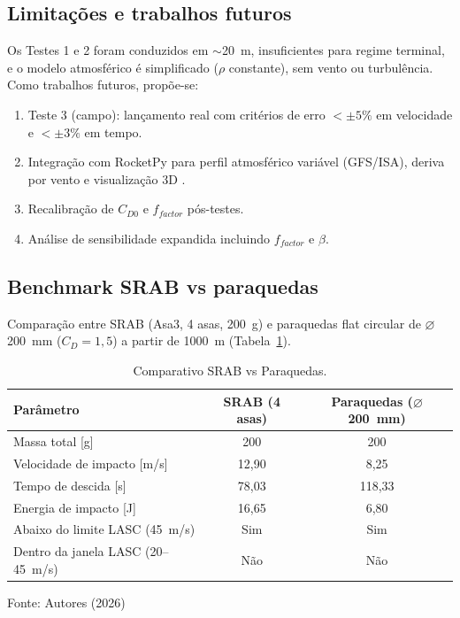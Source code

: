 \documentclass[12pt,fleqn]{article}
\begin{document}
\subsection{Limitações e trabalhos futuros}

Os Testes 1 e 2 foram conduzidos em $\sim$20~m, insuficientes para regime terminal, e o modelo atmosférico é simplificado ($\rho$ constante), sem vento ou turbulência. Como trabalhos futuros, propõe-se:

\begin{enumerate}
  \item Teste 3 (campo): lançamento real com critérios de erro $< \pm 5\%$ em velocidade e $< \pm 3\%$ em tempo.
  \item Integração com RocketPy para perfil atmosférico variável (GFS/ISA), deriva por vento e visualização 3D \citep{rocketpy2024}.
  \item Recalibração de $C_{D0}$ e $f_{factor}$ pós-testes.
  \item Análise de sensibilidade expandida incluindo $f_{factor}$ e $\beta$.
\end{enumerate}

\subsection{Benchmark SRAB vs paraquedas}

Comparação entre SRAB (Asa3, 4 asas, 200~g) e paraquedas flat circular de $\varnothing$200~mm ($C_D = 1,5$) a partir de 1000~m (Tabela~\ref{tab:benchmark}).

\begin{table}[htbp]
\caption{Comparativo SRAB vs Paraquedas.}
\centering
\begin{tabular*}{\textwidth}{@{\extracolsep{\fill}}lcc}
\hline
Parâmetro & SRAB (4 asas) & Paraquedas ($\varnothing$200~mm) \\
\hline
Massa total [g] & 200 & 200 \\
Velocidade de impacto [m/s] & 12,90 & 8,25 \\
Tempo de descida [s] & 78,03 & 118,33 \\
Energia de impacto [J] & 16,65 & 6,80 \\
Abaixo do limite LASC (45~m/s) & Sim & Sim \\
Dentro da janela LASC (20--45~m/s) & Não & Não \\
\hline
\end{tabular*}
{\footnotesize\centering Fonte: Autores (2026)\par}
\label{tab:benchmark}
\end{table}
\end{document}
